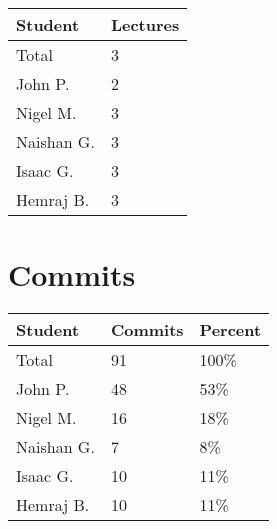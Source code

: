 \documentclass{article}
\begin{document}

\begin{table}[H]
\centering
\begin{tabular}{ll}
\toprule
\textbf{Student} & \textbf{Lectures}\\
\midrule
Total & 3\\
John P. & 2\\
Nigel M. & 3\\
Naishan G. & 3\\
Isaac G. & 3\\
Hemraj B. & 3\\
\bottomrule
\end{tabular}
\end{table}


\section{Commits}


\begin{table}[H]
\centering
\begin{tabular}{lll}
\toprule
\textbf{Student} & \textbf{Commits} & \textbf{Percent}\\
\midrule
Total & 91 & 100\% \\
John P. & 48 & 53\% \\
Nigel M. & 16 & 18\% \\
Naishan G. & 7 & 8\% \\
Isaac G. & 10 & 11\% \\
Hemraj B. & 10 & 11\% \\
\bottomrule
\end{tabular}
\end{table}

\end{document}
